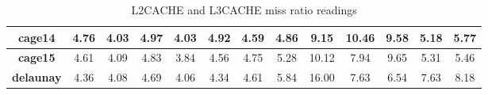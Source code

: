 \begin{table*}[th]
\begin{tabular}{ c|c|c|c|c|c|c|c|c|c|c|c|c| }
  \hline
  \multicolumn{1}{|c|}{\textbf{cage14}}
& 4.76 & \cellcolor{blue!25}4.03 & 4.97 & 4.03 & 4.92 & 4.59 & \cellcolor{green!25}4.86 & 9.15 & 10.46 & 9.58 & 5.18 & 5.77\\ \hline
  \hline
  \multicolumn{1}{|c|}{\textbf{cage15}}
& 4.61 & 4.09 & 4.83 & \cellcolor{blue!25}3.84 & 4.56 & 4.75 & \cellcolor{green!25}5.28 & 10.12 & 7.94 & 9.65 & 5.31 & 5.46\\ \hline
  \hline
  \multicolumn{1}{|c|}{\textbf{delaunay}}
& 4.36 & 4.08 & 4.69 & \cellcolor{blue!25}4.06 & 4.34 & 4.61 & \cellcolor{green!25}5.84 & 16.00 & 7.63 & 6.54 & 7.63 & 8.18\\ \hline
  \hline
\end{tabular}

\caption{\capfont L2CACHE and L3CACHE miss ratio readings }
\label{tab:table2}
\end{table*}





























